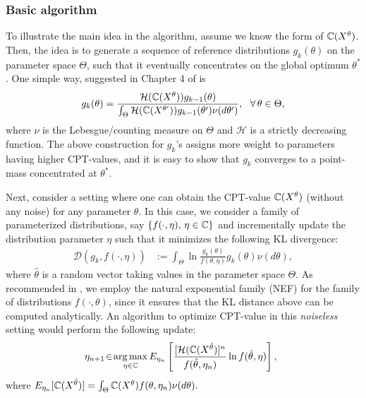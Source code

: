 \subsubsection*{Basic algorithm}
To illustrate the main idea in the algorithm, assume we know the form of $\mathbb{C}(X^{\theta})$. Then, the idea is to generate a sequence of reference distributions $g_k(\theta)$ on the parameter space $\Theta$, such that it eventually concentrates on the global optimum $\theta^*$. One simple way, suggested in Chapter 4 of \cite{chang2013simulation} is
\begin{equation}
\label{eqn:naive}
g_{k}(\theta)=
\frac{\mathcal{H}(\mathbb{C}(X^{\theta}))g_{k-1}(\theta)}
{\int_{\Theta}\mathcal{H}(\mathbb{C}(X^{\theta'}))g_{k-1}(\theta')\nu(d\theta')},
~~\forall\, \theta \in \Theta,
\end{equation}
where $\nu$ is the Lebesgue/counting measure on $\Theta$ and $\mathcal{H}$ is a strictly decreasing function. The above construction for $g_k$'s assigns more weight to parameters having higher CPT-values, and it is easy to show that $g_k$ converges to a point-mass concentrated at $\theta^*$.

Next, consider a setting where one can obtain the CPT-value $\mathbb{C}(X^{\theta})$ (without any noise) for any parameter $\theta$. In this case, we consider a family of parameterized distributions, say $\{f(\cdot,\eta),\,\eta\in \mathbb{C} \}$ and incrementally update the distribution parameter $\eta$ such that it minimizes the following KL divergence:
\begin{align*}
\mathcal{D}(g_k,f(\cdot,\eta))&:=\int_{\Theta}\! \ln \frac{g_{k}(\theta)}{f(\theta,\eta)}g_{k}(\theta)\nu(d\theta), 
\end{align*}
where $\hat \theta$ is a random vector taking values in the parameter space $\Theta$. 
As recommended in \cite{chang2013simulation}, we employ the natural exponential family (NEF) for the family of distributions $f(\cdot,\theta)$, since it ensures that the KL distance above  can be computed analytically. %
An algorithm to optimize CPT-value in this \textit{noiseless} setting would perform the following update:
\begin{align}
 \label{eqn:interior}
\hspace{-0.5em}\eta_{n+1} \!\in\! \mathop{\rm arg\,max}_{\eta \in \mathbb{C}}
E_{\eta_n}\left[\frac{[\mathcal{H}(\mathbb{C}(X^{\hat \theta})]^{n}}
{f(\hat \theta,\eta_{n})}
\ln f(\hat \theta,\eta)\right],
\end{align}
where $E_{\eta_n}[\mathbb{C}(X^{\hat \theta})]=\int_{\Theta} \mathbb{C}(X^{\theta})f(\theta,\eta_n)\nu(d\theta).$



